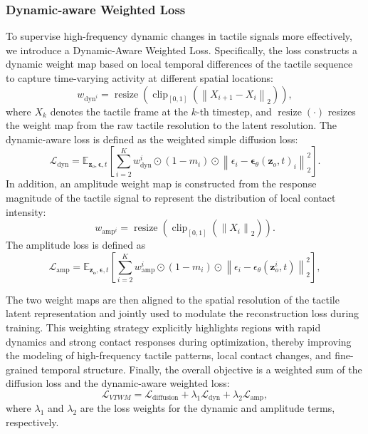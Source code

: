 \subsubsection{Dynamic-aware Weighted Loss}
To supervise high-frequency dynamic changes in tactile signals more effectively, we introduce a Dynamic-Aware Weighted Loss. Specifically, the loss constructs a dynamic weight map based on local temporal differences of the tactile sequence to capture time-varying activity at different spatial locations:
    \begin{equation}
    w_{\text{dyn}^{i}} =
    \operatorname{resize}\left(
    \operatorname{clip}_{[0,1]}
    \left(
    \left\|X_{i+1}-X_i\right\|_2
    \right)
    \right),
    \end{equation}
where $X_k$ denotes the tactile frame at the $k$-th timestep, and $\operatorname{resize}(\cdot)$ resizes the weight map from the raw tactile resolution to the latent resolution. The dynamic-aware loss is defined as the weighted simple diffusion loss:
        \begin{equation}
        \mathcal{L}_{\text{dyn}} =
        \mathbb{E}_{\mathbf{z}_o,\boldsymbol{\epsilon},t}
        \left[
        \sum_{i=2}^{K}
        w_{\text{dyn}}^{i}\odot(1-m_i)
        \odot
        \left\|
        \epsilon_{i}-\boldsymbol{\epsilon}_\theta(\mathbf{z}_o,t)_{i}
        \right\|_2^2
        \right].
        \end{equation}
In addition, an amplitude weight map is constructed from the response magnitude of the tactile signal to represent the distribution of local contact intensity:
\begin{equation}
w_{\text{amp}^{i}} =
\operatorname{resize}\left(
\operatorname{clip}_{[0,1]}
\left(
\left\|X_i\right\|_2
\right)
\right).
\end{equation}
The amplitude loss is defined as
\begin{equation}
\mathcal{L}_{\text{amp}}=\mathbb{E}_{\boldsymbol{z_o}, \boldsymbol{\epsilon}, t}\left[\sum_{i=2}^K w_{\text{amp}}^i \odot \left(1-m_i\right) \odot \left\|\epsilon_i-\epsilon_\theta\left(\mathbf{z}_{o}^{i}, t\right)\right\|_2^2\right],
\end{equation}
 
The two weight maps are then aligned to the spatial resolution of the tactile latent representation and jointly used to modulate the reconstruction loss during training. This weighting strategy explicitly highlights regions with rapid dynamics and strong contact responses during optimization, thereby improving the modeling of high-frequency tactile patterns, local contact changes, and fine-grained temporal structure.
Finally, the overall objective is a weighted sum of the diffusion loss and the dynamic-aware weighted loss:
    \begin{equation}
    \mathcal{L}_{VTWM}
    =
    \mathcal{L}_{\text{diffusion}}
    +
    \lambda_1 \mathcal{L}_{\text{dyn}}
    +
    \lambda_2 \mathcal{L}_{\text{amp}},
    \end{equation}
where $\lambda_1$ and $\lambda_2$ are the loss weights for the dynamic and amplitude terms, respectively.

